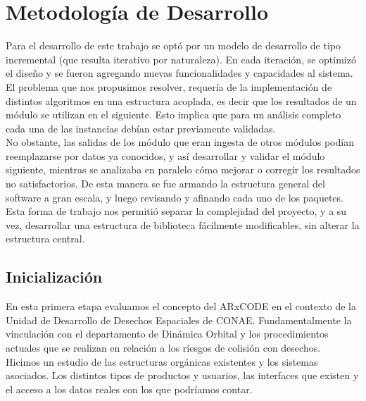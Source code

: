 \chapter{Metodología de Desarrollo}
\label{chap:metodologia}
Para el desarrollo de este trabajo se opt\'o por un modelo de desarrollo de tipo incremental (que resulta iterativo por naturaleza).
En cada iteraci\'on, se optimiz\'o el dise\~no y se fueron agregando nuevas funcionalidades y capacidades al sistema.\\

El problema que nos propusimos resolver, requer\'ia de la implementaci\'on de distintos algoritmos en una estructura acoplada, es decir que los resultados de un m\'odulo se utilizan en el siguiente. Esto implica que para un an\'alisis completo cada una de las instancias deb\'ian estar previamente validadas.\\
No obstante, las salidas de los m\'odulo que eran ingesta de otros m\'odulos pod\'ian reemplazarse por datos ya conocidos, y as\'i desarrollar y validar el m\'odulo siguiente, mientras se analizaba en paralelo c\'omo mejorar o corregir los resultados no satisfactorios. De esta manera se fue armando la estructura general del software a gran escala, y luego revisando y afinando cada uno de los paquetes.\\

Esta forma de trabajo nos permiti\'o separar la complejidad del proyecto, y a su vez, desarrollar una estructura de biblioteca f\'acilmente modificables, sin alterar la estructura central.\\

\section{Inicializaci\'on}
En esta primera etapa evaluamos  el concepto del ARxCODE en el contexto de la Unidad de Desarrollo de Desechos Espaciales de CONAE. Fundamentalmente la vinculaci\'on con el departamento de Din\'amica Orbital y los procedimientos actuales que se realizan en relaci\'on a los riesgos de colisi\'on con desechos.\\

Hicimos un estudio de las estructuras org\'anicas existentes y los sistemas asociados. Los distintos tipos de productos y usuarios, las interfaces que existen y el acceso a los datos reales con los que podr\'iamos contar.\\

